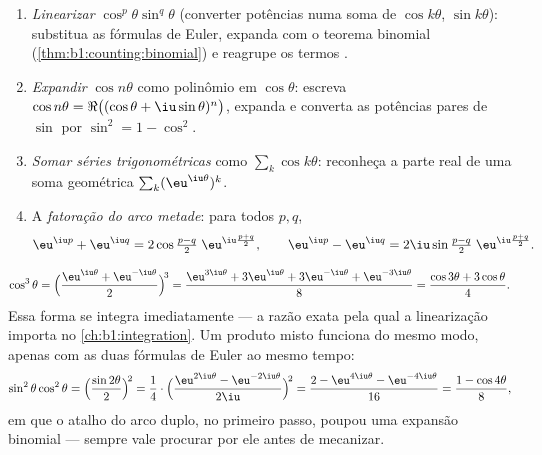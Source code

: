 \begin{method}\label{met:b1:complex:trig}
\begin{enumerate}
  \item \emph{Linearizar} $\cos^p\theta \sin^q\theta$ (converter potências numa
        soma de $\cos k\theta$, $\sin k\theta$): substitua as fórmulas de
        Euler, expanda com o teorema binomial
        (\cref{thm:b1:counting:binomial}) e reagrupe os termos .
  \item \emph{Expandir} $\cos n\theta$ como polinômio em $\cos\theta$:
        escreva $\cos n\theta = \Re\bigl((\cos\theta +
        \iu\sin\theta)^n\bigr)$, expanda e converta as potências pares de
        $\sin$ por $\sin^2 = 1 - \cos^2$.
  \item \emph{Somar séries trigonométricas} como $\sum_k \cos k\theta$:
        reconheça a parte real de uma soma geométrica $\sum_k
        (\eu^{\iu\theta})^k$.
  \item A \emph{fatoração do arco metade}: para todos $p, q$,
        \[
        \eu^{\iu p} + \eu^{\iu q}
        = 2 \cos\tfrac{p - q}{2}\; \eu^{\iu \frac{p+q}{2}},
        \qquad
        \eu^{\iu p} - \eu^{\iu q}
        = 2\iu \sin\tfrac{p - q}{2}\; \eu^{\iu \frac{p+q}{2}} .
        \]
\end{enumerate}
\end{method}

\begin{example}[Linearização]\label{ex:b1:complex:linearize}
\[
\cos^3\theta
= \Bigl(\frac{\eu^{\iu\theta} + \eu^{-\iu\theta}}{2}\Bigr)^{\!3}
= \frac{\eu^{3\iu\theta} + 3\eu^{\iu\theta} + 3\eu^{-\iu\theta} +
\eu^{-3\iu\theta}}{8}
= \frac{\cos 3\theta + 3\cos\theta}{4}.
\]
Essa forma se integra imediatamente --- a razão exata pela qual a
linearização importa no \cref{ch:b1:integration}. Um produto misto funciona
do mesmo modo, apenas com as duas fórmulas de Euler ao mesmo tempo:
\[
\sin^2\theta\cos^2\theta
= \Bigl(\frac{\sin2\theta}2\Bigr)^{\!2}
= \frac{1}{4}\cdot
\Bigl(\frac{\eu^{2\iu\theta} - \eu^{-2\iu\theta}}{2\iu}
\Bigr)^{\!2}
= \frac{2 - \eu^{4\iu\theta} - \eu^{-4\iu\theta}}{16}
= \frac{1 - \cos4\theta}{8} ,
\]
em que o atalho do arco duplo, no primeiro passo, poupou uma
expansão binomial --- sempre vale procurar por ele antes de
mecanizar.
\end{example}

